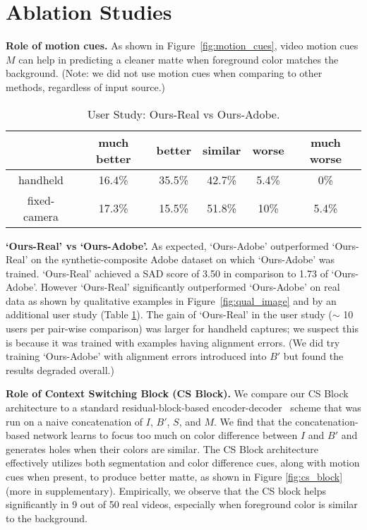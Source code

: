 \documentclass[10pt,twocolumn,letterpaper]{article}
\begin{document}
 \vspace{-0.5em}
\section{Ablation Studies}
\label{sec:abla}
\textbf{Role of motion cues.} As shown in Figure~\ref{fig:motion_cues}, video motion cues $M$  can help in predicting a cleaner matte when foreground color matches the background.  (Note:  we did not use motion cues when comparing to other methods, regardless of input source.)
\begin{table}[!h]
\setlength\tabcolsep{2pt}
	\centering
	\small
	\captionsetup{justification=centering}
    	\vspace{-.5em}
		\begin{tabular}{c|ccccc}
			\toprule
			  &  much better & better & similar & worse & much worse \\ 
			 \midrule
			 handheld & 16.4\% & 35.5\% & 42.7\% & 5.4\% & 0\%\\
			 fixed-camera & 17.3\% & 15.5\% & 51.8\% & 10\% & 5.4\%\\
			\bottomrule
		\end{tabular}
		\vspace{-.5em}
		\caption{\small User Study: Ours-Real vs Ours-Adobe.}
	\vspace{-.5em}
	\label{tab:syn-real}
\end{table}

\textbf{`Ours-Real' vs `Ours-Adobe'.} As expected, `Ours-Adobe' outperformed `Ours-Real' on the synthetic-composite Adobe dataset on which `Ours-Adobe' was trained. `Ours-Real' achieved a SAD score of 3.50 in comparison to 1.73 of `Ours-Adobe'. However `Ours-Real' significantly outperformed `Ours-Adobe' on real data as shown by qualitative examples in Figure~\ref{fig:qual_image} and by an additional user study (Table \ref{tab:syn-real}).  The gain of `Ours-Real' in the user study ($\sim$ 10 users per pair-wise comparison) was larger for handheld captures; we suspect this is because it was trained with examples having alignment errors.  (We did try training `Ours-Adobe' with alignment errors introduced into $B'$ but found the results degraded overall.) 



\textbf{Role of Context Switching Block (CS Block).} We compare our CS Block architecture to a standard residual-block-based encoder-decoder~\cite{zhu2017unpaired} scheme that was run on a naive concatenation of $I$, $B'$, $S$, and $M$.  We find that the concatenation-based network learns to focus too much on color difference between $I$ and $B'$ and generates holes when their colors are similar.  The CS Block architecture effectively utilizes both segmentation and color difference cues, along with motion cues when present, to produce better matte, as shown in Figure \ref{fig:cs_block} (more in supplementary). Empirically, we observe that the CS block helps significantly in 9 out of 50 real videos, especially when foreground color is similar to the background.
\end{document}
